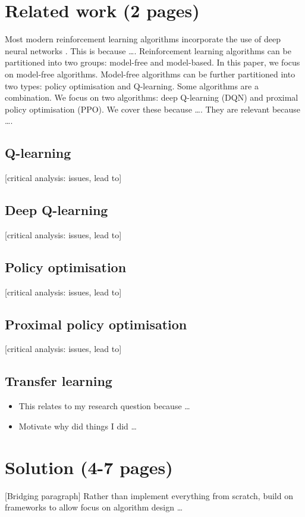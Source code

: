 \documentclass[12pt,a4paper]{article}
\begin{document}
\newpage
\section{Related work (2 pages)}
\label{section:related-work}
Most modern reinforcement learning algorithms incorporate the use of deep neural networks \cite{}. This is because \dots. Reinforcement learning algorithms can be partitioned into two groups: model-free and model-based. In this paper, we focus on model-free algorithms. Model-free algorithms can be further partitioned into two types: policy optimisation and Q-learning. Some algorithms are a combination. We focus on two algorithms: deep Q-learning (DQN) and proximal policy optimisation (PPO). We cover these because \dots. They are relevant because \dots. 

\subsection{Q-learning}
[critical analysis: issues, lead to]

\subsection{Deep Q-learning}
[critical analysis: issues, lead to]

\subsection{Policy optimisation}
[critical analysis: issues, lead to]

\subsection{Proximal policy optimisation}
[critical analysis: issues, lead to]

\subsection{Transfer learning}

\begin{itemize}
    \item This relates to my research question because \dots 
    \item Motivate why did things I did \dots
\end{itemize}
 
\section{Solution (4-7 pages)}
[Bridging paragraph] Rather than implement everything from scratch, build on frameworks to allow focus on algorithm design \dots
\end{document}
